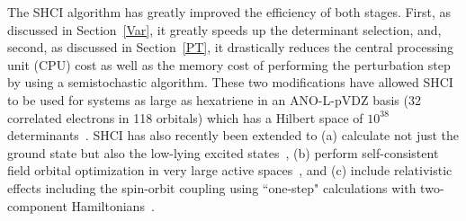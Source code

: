 \documentclass[%
reprint,
 superscriptaddress,
 amsmath,amssymb,
 aps,
]{revtex4-1}
\begin{document}
The SHCI algorithm has greatly improved the efficiency of both stages.
First, as discussed in Section~\ref{Var}, it greatly speeds up the determinant selection, and, second, as discussed in
Section~\ref{PT}, it drastically reduces the central processing unit (CPU) cost as well as the memory cost of performing the perturbation step by using a semistochastic algorithm.
These two modifications have allowed SHCI to be used for systems as large as hexatriene
in an ANO-L-pVDZ basis (32 correlated electrons in 118 orbitals) which has a Hilbert space of $10^{38}$ determinants~\cite{ChiHolOttUmrShaZim-JPCA-18}.
SHCI has also recently been extended to (a) calculate not just the ground state but also the low-lying excited states~\cite{HolUmrSha-JCP-17}, 
(b) perform self-consistent field orbital optimization in very large active spaces~\cite{SmiMusHolSha-JCTC-17},
and (c) include relativistic effects including the spin-orbit coupling using ``one-step" calculations with two-component Hamiltonians~\cite{MusSha-JCTC-17}.
\end{document}
